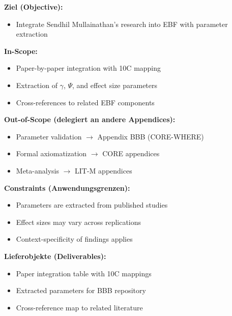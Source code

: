 
\begin{tcolorbox}[
    colback=orange!5!white,
    colframe=orange!75!black,
    title={\textbf{Appendix Scope: Ziel / In-Scope / Out-of-Scope / Constraints}},
    fonttitle=\bfseries
]

\textbf{Ziel (Objective):}
\begin{itemize}[nosep]
    \item Integrate Sendhil Mullainathan's research into EBF with parameter extraction
\end{itemize}

\textbf{In-Scope:}
\begin{itemize}[nosep]
    \item Paper-by-paper integration with 10C mapping
    \item Extraction of $\gamma$, $\Psi$, and effect size parameters
    \item Cross-references to related EBF components
\end{itemize}

\textbf{Out-of-Scope (delegiert an andere Appendices):}
\begin{itemize}[nosep]
    \item Parameter validation $\rightarrow$ Appendix BBB (CORE-WHERE)
    \item Formal axiomatization $\rightarrow$ CORE appendices
    \item Meta-analysis $\rightarrow$ LIT-M appendices
\end{itemize}

\textbf{Constraints (Anwendungsgrenzen):}
\begin{itemize}[nosep]
    \item Parameters are extracted from published studies
    \item Effect sizes may vary across replications
    \item Context-specificity of findings applies
\end{itemize}

\textbf{Lieferobjekte (Deliverables):}
\begin{itemize}[nosep]
    \item Paper integration table with 10C mappings
    \item Extracted parameters for BBB repository
    \item Cross-reference map to related literature
\end{itemize}

\end{tcolorbox}


